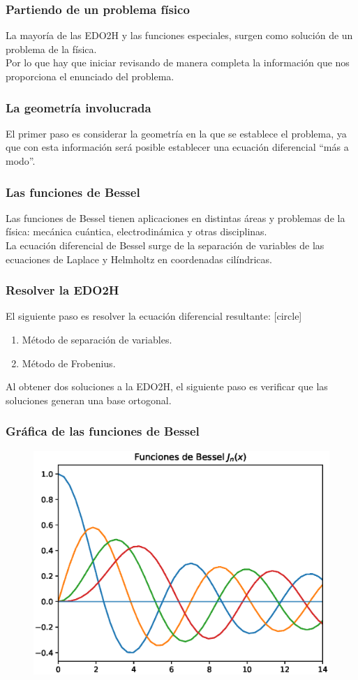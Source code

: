 \documentclass[12pt]{beamer}
\begin{document}
\begin{frame}
\frametitle{Partiendo de un problema físico}
La mayoría de las EDO2H y las funciones especiales, surgen como solución de un problema de la física.
\\
\bigskip
\pause
Por lo que hay que iniciar revisando de manera completa la información que nos proporciona el enunciado del problema.
\end{frame}
\begin{frame}
\frametitle{La geometría involucrada}
El primer paso es considerar la geometría en la que se establece el problema, ya que con esta información será posible establecer una ecuación diferencial \enquote{más a modo}.
\end{frame}
\begin{frame}
\frametitle{Las funciones de Bessel}
Las funciones de Bessel tienen aplicaciones en distintas áreas y problemas de la física: mecánica cuántica, electrodinámica y otras disciplinas.
\\
\bigskip
\pause
La ecuación diferencial de Bessel surge de la separación de variables de las ecuaciones de Laplace y Helmholtz en coordenadas cilíndricas.
\end{frame}
\begin{frame}
\frametitle{Resolver la EDO2H}
El siguiente paso es resolver la ecuación diferencial resultante:
\pause
{}
[circle]
\begin{enumerate}[<+->]
\item Método de separación de variables.
\item Método de Frobenius.
\end{enumerate}
\pause
Al obtener dos soluciones a la EDO2H, el siguiente paso es verificar que las soluciones generan una base ortogonal.
\end{frame}
\begin{frame}
\frametitle{Gráfica de las funciones de Bessel}
\begin{figure}
    \centering
    \includegraphics[scale=0.57]{Imagenes/plot_Bessel.eps}
\end{figure}
\end{frame}
\end{document}
